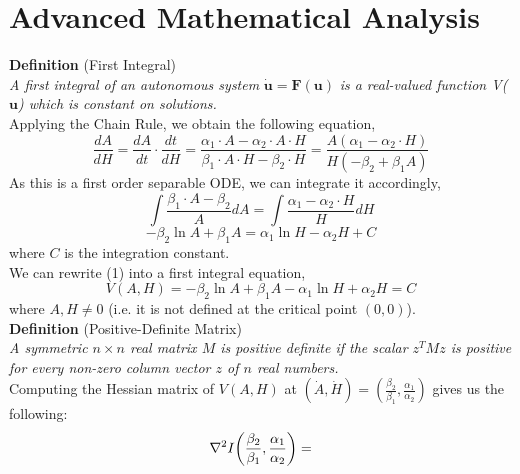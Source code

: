 \documentclass{article}
\newcommand*\circled[1]{\tikz[baseline=(char.base)]{
            \node[shape=circle,draw,inner sep=2pt] (char) {#1};}}
\begin{document}
\section*{\circled{5} Advanced Mathematical Analysis}
\iffalse
{\par
\textbf{Definition} (First Integral) \\\textit{A first integral of an autonomous system } $\dot{\mathbf{u}}\mathbf{=F(\mathbf{u})}$ \textit{is a real-valued function V($\mathbf{u}$) which is constant on solutions.} \\\newline
Applying the Chain Rule, we obtain the following equation, 
\begin{equation*}
    \frac{dA}{dH} = \frac{dA}{dt} \cdot \frac{dt}{dH} = \frac{\alpha_1\cdot A-\alpha_2\cdot A\cdot H}{\beta_1\cdot A\cdot H-\beta_2\cdot H}=\frac{A(\alpha_1-\alpha_2\cdot H)}{H(-\beta_2+\beta_1 A)}
\end{equation*}
As this is a first order separable ODE, we can integrate it accordingly, 
\begin{equation*}
    \int {\frac{\beta_1\cdot A-\beta_2}{A}} dA = \int {\frac{\alpha_1-\alpha_2\cdot H}{H}} dH 
\end{equation*}
\begin{equation}
    -\beta_2 \ln{A} + \beta_1 A = \alpha_1 \ln{H} - \alpha_2H + C
\end{equation}
where $C$ is the integration constant. \\\newline
We can rewrite (1) into a first integral equation,
\begin{equation*}
V(A,H) =  -\beta_2 \ln{A} + \beta_1 A - \alpha_1 \ln{H} + \alpha_2H = C
\end{equation*}
where $A,H\neq 0$ (i.e. it is not defined at the critical point $(0,0)$).\\
\newline \noindent
\textbf{Definition} (Positive-Definite Matrix)\\
\textit{A symmetric $n\times n$ real matrix $M$ is positive definite if the scalar $z^TMz$ is positive for every non-zero column vector $z$ of $n$ real numbers.}\\
\newline
Computing the Hessian matrix of $V(A,H)$ at $(\dot{A},\dot{H})=(\frac{\beta_2}{\beta_1},\frac{\alpha_1}{\alpha_2})$ gives us the following: \\
\begin{equation*}
\nabla^2 I\bigg{(}\frac{\beta_2}{\beta_1},\frac{\alpha_1}{\alpha_2}\bigg{)} = 

\end{equation*}}
\end{document}
